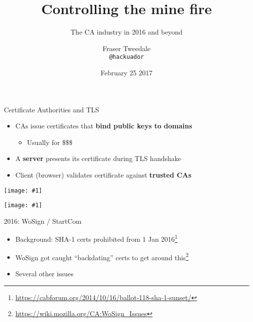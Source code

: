 \documentclass[ignorenonframetext,aspectratio=169]{beamer}
\title{Controlling the mine fire}
\subtitle{The CA industry in 2016 and beyond}
\author{Fraser Tweedale\\
    \texttt{@hackuador}}
\date{February 25 2017}
\makeatletter
\def\maxwidth{\ifdim\Gin@nat@width>\linewidth\linewidth\else\Gin@nat@width\fi}
\def\maxheight{\ifdim\Gin@nat@height>\textheight0.8\textheight\else\Gin@nat@height\fi}
\newcommand{\includegraphicsscaled}[1]{
    \texttt{[image: \#1]}
}
\makeatother
\begin{document}
\frame{\titlepage}

\begin{frame}[plain]

\begin{center}
\def\svgwidth{.2\paperheight}

\end{center}

\end{frame}

\begin{frame}{Certificate Authorities and TLS}

\begin{itemize}
\item
  CAs issue certificates that \textbf{bind public keys to domains}

  \begin{itemize}
  \item
    Usually for \$\$\$
  \end{itemize}
\item
  A \textbf{server} presents its certificate during TLS handshake
\item
  Client (browser) validates certificate against \textbf{trusted CAs}
\end{itemize}

\end{frame}

\begin{frame}[plain]

\begin{center}
\includegraphicsscaled{ff-cas.png}
\end{center}

\end{frame}


\begin{frame}[plain]

\begin{center}
\includegraphicsscaled{Censign.jpg}
\end{center}

\end{frame}

\begin{frame}{2016: WoSign / StartCom}

\begin{itemize}
\item Background: SHA-1 certs prohibited from 1 Jan 2016\footnote[frame]{
  \url{https://cabforum.org/2014/10/16/ballot-118-sha-1-sunset/}}
\item WoSign got caught ``backdating'' certs to get around this\footnote[frame]{
  \url{https://wiki.mozilla.org/CA:WoSign_Issues}}
\item Several other issues
\end{itemize}

\end{frame}
\end{document}
